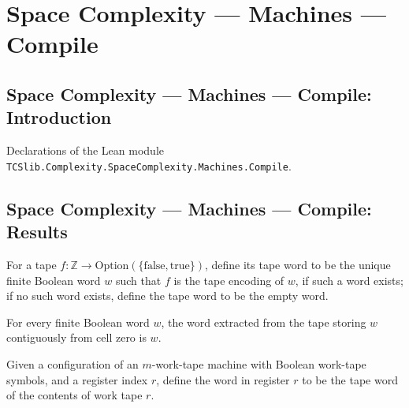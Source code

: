 \section{Space Complexity --- Machines --- Compile}
\subsection*{Space Complexity --- Machines --- Compile: Introduction}

Declarations of the Lean module \texttt{TCSlib.Complexity.SpaceComplexity.Machines.Compile}.

\subsection*{Space Complexity --- Machines --- Compile: Results}

\begin{definition}
\label{Complexity.LogProg.tapeWord}
\leanok
{}
For a tape $f\colon\mathbb{Z}\to\mathrm{Option}(\{\mathrm{false},\mathrm{true}\})$,
define its tape word to be the unique finite Boolean word $w$ such that $f$ is the tape
encoding of $w$, if such a word exists; if no such word exists, define the tape word to
be the empty word.
\end{definition}

\begin{lemma}
\label{Complexity.LogProg.tapeWord_bufferTape}
\leanok
{}
For every finite Boolean word $w$, the word extracted from the tape storing $w$
contiguously from cell zero is $w$.
\end{lemma}

\begin{definition}
\label{Complexity.LogProg.regWords}
\leanok
{}
Given a configuration of an $m$-work-tape machine with Boolean work-tape symbols, and a
register index $r$, define the word in register $r$ to be the tape word of the contents
of work tape $r$.
\end{definition}

